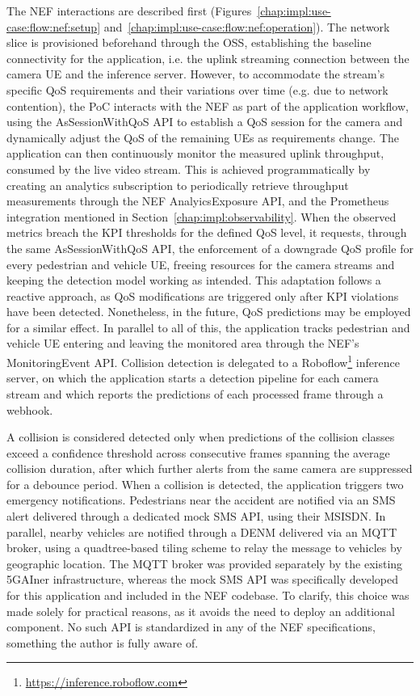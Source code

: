 The \acs{NEF} interactions are described first (Figures~\ref{chap:impl:use-case:flow:nef:setup} and~\ref{chap:impl:use-case:flow:nef:operation}). The network slice is provisioned beforehand through the \acs{OSS}, establishing the baseline connectivity for the application, i.e. the uplink streaming connection between the camera \acs{UE} and the inference server. However, to accommodate the stream's specific \acs{QoS} requirements and their variations over time (e.g. due to network contention), the \acs{PoC} interacts with the \acs{NEF} as part of the application workflow, using the AsSessionWithQoS \acs{API} to establish a \acs{QoS} session for the camera and dynamically adjust the \acs{QoS} of the remaining \acsp{UE} as requirements change. The application can then continuously monitor the measured uplink throughput, consumed by the live video stream. This is achieved programmatically by creating an analytics subscription to periodically retrieve throughput measurements through the \acs{NEF} AnalyicsExposure \acs{API}, and the Prometheus integration mentioned in Section~\ref{chap:impl:observability}. When the observed metrics breach the \acs{KPI} thresholds for the defined \acs{QoS} level, it requests, through the same AsSessionWithQoS \acs{API}, the enforcement of a downgrade \acs{QoS} profile for every pedestrian and vehicle \acs{UE}, freeing resources for the camera streams and keeping the detection model working as intended. This adaptation follows a reactive approach, as \acs{QoS} modifications are triggered only after \acs{KPI} violations have been detected. Nonetheless, in the future, \acs{QoS} predictions may be employed for a similar effect. In parallel to all of this, the application tracks pedestrian and vehicle \acs{UE} entering and leaving the monitored area through the \acs{NEF}'s MonitoringEvent \acs{API}. Collision detection is delegated to a Roboflow\footnote{\url{https://inference.roboflow.com}} inference server, on which the application starts a detection pipeline for each camera stream and which reports the predictions of each processed frame through a webhook.

A collision is considered detected only when predictions of the collision classes exceed a confidence threshold across consecutive frames spanning the average collision duration, after which further alerts from the same camera are suppressed for a debounce period. When a collision is detected, the application triggers two emergency notifications. Pedestrians near the accident are notified via an \acs{SMS} alert delivered through a dedicated mock \acs{SMS} \acs{API}, using their \acs{MSISDN}. In parallel, nearby vehicles are notified through a \acs{DENM} delivered via an \acs{MQTT} broker, using a quadtree-based tiling scheme to relay the message to vehicles by geographic location. The \acs{MQTT} broker was provided separately by the existing 5GAIner infrastructure, whereas the mock \acs{SMS} \acs{API} was specifically developed for this application and included in the \acs{NEF} codebase. To clarify, this choice was made solely for practical reasons, as it avoids the need to deploy an additional component. No such \acs{API} is standardized in any of the \acs{NEF} specifications, something the author is fully aware of.

